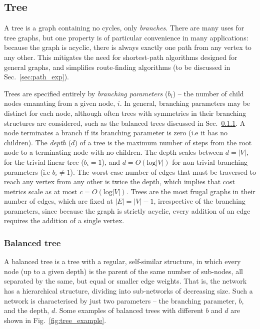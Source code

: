 \documentclass[aps,rmp,twocolumn,amsmath,amssymb,nofootinbib,superscriptaddress]{revtex4}
\begin{document}
%
%

\subsection{Tree} \label{sec:tree_graph}

A tree is a graph containing no cycles, only \emph{branches}. There are many uses for tree graphs, but one property is of particular convenience in many applications: because the graph is acyclic, there is always exactly one path from any vertex to any other. This mitigates the need for shortest-path algorithms designed for general graphs, and simplifies route-finding algorithms (to be discussed in Sec.~\ref{sec:path_exp}).

Trees are specified entirely by \emph{branching parameters} ($b_i$) -- the number of child nodes emanating from a given node, $i$. In general, branching parameters may be distinct for each node, although often trees with symmetries in their branching structures are considered, such as the balanced trees discussed in Sec.~\ref{sec:bal_tree}. A node terminates a branch if its branching parameter is zero (i.e it has no children). The \emph{depth} ($d$) of a tree is the maximum number of steps from the root node to a terminating node with no children. The depth scales between \mbox{$d=|V|$}, for the trivial linear tree (\mbox{$b_i=1$}), and \mbox{$d=O(\mathrm{log}|V|)$} for non-trivial branching parameters (i.e \mbox{$b_i\neq 1$}). The worst-case number of edges that must be traversed to reach any vertex from any other is twice the depth, which implies that cost metrics scale as at most \mbox{$c=O(\mathrm{log}|V|)$}. Trees are the most frugal graphs in their number of edges, which are fixed at \mbox{$|E|=|V|-1$}, irrespective of the branching parameters, since because the graph is strictly acyclic, every addition of an edge requires the addition of a single vertex.

%
%

\subsubsection{Balanced tree} \label{sec:bal_tree}

A balanced tree is a tree with a regular, self-similar structure, in which every node (up to a given depth) is the parent of the same number of sub-nodes, all separated by the same, but equal or smaller edge weights. That is, the network has a hierarchical structure, dividing into sub-networks of decreasing size. Such a network is characterised by just two parameters -- the branching parameter, $b$, and the depth, $d$. Some examples of balanced trees with different $b$ and $d$ are shown in Fig.~\ref{fig:tree_example}.
\end{document}
